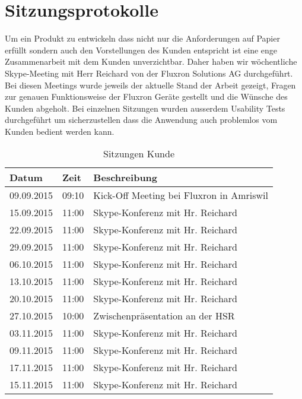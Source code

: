 \section{Sitzungsprotokolle}
\label{Sitzungsprotokolle}

Um ein Produkt zu entwickeln dass nicht nur die Anforderungen auf Papier erfüllt sondern auch den Vorstellungen des Kunden entspricht ist eine enge Zusammenarbeit mit dem Kunden unverzichtbar. Daher haben wir wöchentliche Skype-Meeting mit Herr Reichard von der Fluxron Solutions AG durchgeführt. Bei diesen Meetings wurde jeweils der aktuelle Stand der Arbeit gezeigt, Fragen zur genauen Funktionsweise der Fluxron Geräte gestellt und die Wünsche des Kunden abgeholt. Bei einzelnen Sitzungen wurden ausserdem Usability Tests durchgeführt um sicherzustellen dass die Anwendung auch problemlos vom Kunden bedient werden kann.

\begin{table}[H]
\begin{tabularx}{\textwidth}{ l | l | X}
\textbf{Datum}& \textbf{Zeit} & \textbf{Beschreibung}\\ \hline
09.09.2015 & 09:10 & Kick-Off Meeting bei Fluxron in Amriswil\\ \hline
15.09.2015 & 11:00 & Skype-Konferenz mit Hr. Reichard\\ \hline
22.09.2015 & 11:00 & Skype-Konferenz mit Hr. Reichard\\ \hline
29.09.2015 & 11:00 & Skype-Konferenz mit Hr. Reichard\\ \hline
06.10.2015 & 11:00 & Skype-Konferenz mit Hr. Reichard\\ \hline
13.10.2015 & 11:00 & Skype-Konferenz mit Hr. Reichard\\ \hline
20.10.2015 & 11:00 & Skype-Konferenz mit Hr. Reichard\\ \hline
27.10.2015 & 10:00 & Zwischenpräsentation an der \ac{HSR}\\ \hline
03.11.2015 & 11:00 & Skype-Konferenz mit Hr. Reichard\\ \hline
09.11.2015 & 11:00 & Skype-Konferenz mit Hr. Reichard\\ \hline
17.11.2015 & 11:00 & Skype-Konferenz mit Hr. Reichard\\ \hline
15.11.2015 & 11:00 & Skype-Konferenz mit Hr. Reichard\\
\end{tabularx}
\caption{Sitzungen Kunde}
\end{table}

